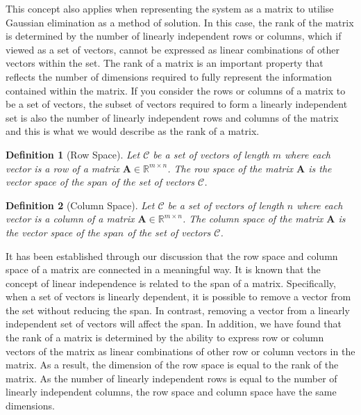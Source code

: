 \documentclass[12pt]{book}
\newtheorem{definition}{Definition}[section]
\begin{document}
	This concept also applies when representing the system as a matrix to utilise Gaussian elimination as a method of solution. In this case, the rank of the matrix is determined by the number of linearly independent rows or columns, which if viewed as a set of vectors, cannot be expressed as linear combinations of other vectors within the set. The rank of a matrix is an important property that reflects the number of dimensions required to fully represent the information contained within the matrix. If you consider the rows or columns of a matrix to be a set of vectors, the subset of vectors required to form a linearly independent set is also the number of linearly independent rows and columns of the matrix and this is what we would describe as the rank of a matrix.
	
	\begin{definition}[Row Space]
		\normalfont Let $\mathcal{C}$ be a set of vectors of length $m$ where each vector is a row of a matrix $\textbf{A} \in \mathbb{R}^{m \times n}$. The row space of the matrix $\textbf{A}$ is the vector space of the $span$ of the set of vectors $\mathcal{C}$. 
	\end{definition}
	
	\begin{definition}[Column Space]
		\normalfont Let $\mathcal{C}$ be a set of vectors of length $n$ where each vector is a column of a matrix $\textbf{A} \in \mathbb{R}^{m \times n}$. The column space of the matrix $\textbf{A}$ is the vector space of the $span$ of the set of vectors $\mathcal{C}$. 
	\end{definition}
	
	It has been established through our discussion that the row space and column space of a matrix are connected in a meaningful way. It is known that the concept of linear independence is related to the span of a matrix. Specifically, when a set of vectors is linearly dependent, it is possible to remove a vector from the set without reducing the span. In contrast, removing a vector from a linearly independent set of vectors will affect the span. In addition, we have found that the rank of a matrix is determined by the ability to express row or column vectors of the matrix as linear combinations of other row or column vectors in the matrix. As a result, the dimension of the row space is equal to the rank of the matrix. As the number of linearly independent rows is equal to the number of linearly independent columns, the row space and column space have the same dimensions.
	
\end{document}
